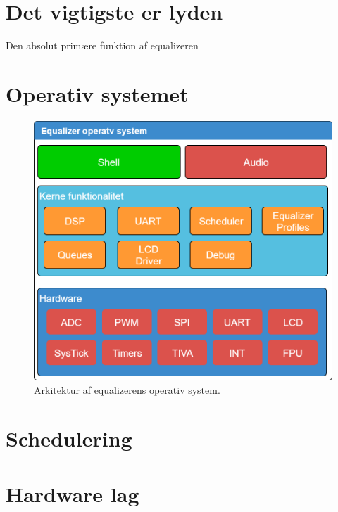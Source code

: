 \section{Det vigtigste er lyden}
Den absolut primære funktion af equalizeren    



\section{Operativ systemet}

\begin{figure}[h!]
	\centering
	\includegraphics[width=.8\textwidth]{billeder/eq_os.png}
	\caption{Arkitektur af equalizerens operativ system.}
	\label{fig:eq_os}
\end{figure}
\FloatBlock


\section{Schedulering}




\section{Hardware lag}



